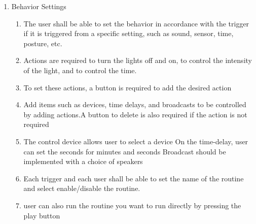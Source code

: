\begin{enumerate}[label=\arabic*.]
\begin{enumerate}[label*={\arabic*.}]
\begin{enumerate}[label*={\alph*.},ref=\theenumi.\arabic*]
\begin{enumerate}[label*={\arabic*.},ref=\theenumi.\arabic*]
                                    \end{enumerate}

                        \end{enumerate}
                  \item {\large{Behavior Settings}}\\

                        \begin{enumerate}[label*={\arabic*.},ref=\theenumi.\arabic*]
                              \setlength{\itemindent}{0.5cm}
                              \item The user shall be able to set the behavior in accordance with the trigger if it is triggered from a specific setting, such as sound, sensor, time, posture, etc.\\

                              \item Actions are required to turn the lights off and on, to control the intensity of the light, and to control the time.\\

                              \item To set these actions, a button is required to add the desired action
                                    \\

                              \item Add items such as devices, time delays, and broadcasts to be controlled by adding actions.A button to delete is also required if the action is not required
                                    \\

                              \item The control device allows user to select a device
                                    On the time-delay, user can set the seconds for minutes and seconds Broadcast should be implemented with a choice of speakers
                                    \\

                              \item Each trigger and each user shall be able to set the name of the routine and select enable/disable the routine.
                                    \\

                              \item user can also run the routine you want to run directly by pressing the play button
                                    \\
                        \end{enumerate}
            \end{enumerate}


\end{enumerate}
